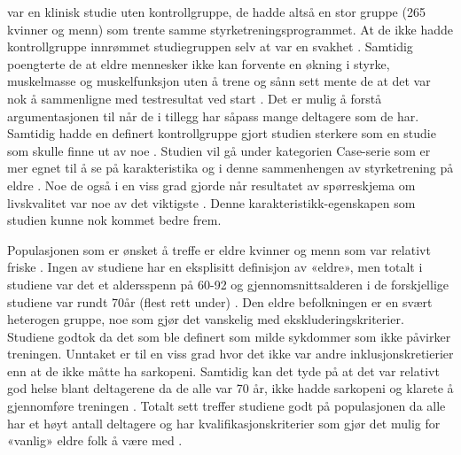 \documentclass[
]{book}
\begin{document}
\citet{geirsdottir2012} var en klinisk studie uten kontrollgruppe, de hadde altså en stor gruppe (265 kvinner og menn) som trente samme styrketreningsprogrammet. At de ikke hadde kontrollgruppe innrømmet studiegruppen selv at var en svakhet \citep{geirsdottir2012}. Samtidig poengterte de at eldre mennesker ikke kan forvente en økning i styrke, muskelmasse og muskelfunksjon uten å trene og sånn sett mente de at det var nok å sammenligne med testresultat ved start \citep{geirsdottir2012}. Det er mulig å forstå argumentasjonen til \citet{geirsdottir2012} når de i tillegg har såpass mange deltagere som de har. Samtidig hadde en definert kontrollgruppe gjort studien sterkere som en studie som skulle finne ut av noe \citep[s. 87]{hulley2013}. Studien vil gå under kategorien Case-serie som er mer egnet til å se på karakteristika og i denne sammenhengen av styrketrening på eldre \citep[s. 87]{hulley2013}. Noe de også i en viss grad gjorde når resultatet av spørreskjema om livskvalitet var noe av det viktigste \citep{geirsdottir2012}. Denne karakteristikk-egenskapen som studien kunne nok kommet bedre frem.

Populasjonen som er ønsket å treffe er eldre kvinner og menn som var relativt friske \citep{geirsdottir2012, schott2019, turpela2017, vikberg2019, vincent2002}. Ingen av studiene har en eksplisitt definisjon av «eldre», men totalt i studiene var det et aldersspenn på 60-92 og gjennomsnittsalderen i de forskjellige studiene var rundt 70år (flest rett under) \citep{geirsdottir2012, schott2019, turpela2017, vikberg2019, vincent2002}. Den eldre befolkningen er en svært heterogen gruppe, noe som gjør det vanskelig med ekskluderingskriterier. Studiene godtok da det som ble definert som milde sykdommer som ikke påvirker treningen. Unntaket er til en viss grad \citet{vikberg2019} hvor det ikke var andre inklusjonskretierier enn at de ikke måtte ha sarkopeni. Samtidig kan det tyde på at det var relativt god helse blant deltagerene da de alle var 70 år, ikke hadde sarkopeni og klarete å gjennomføre treningen \citep{vikberg2019}. Totalt sett treffer studiene godt på populasjonen da alle har et høyt antall deltagere og har kvalifikasjonskriterier som gjør det mulig for «vanlig» eldre folk å være med \citep{geirsdottir2012, schott2019, turpela2017, vikberg2019, vincent2002}.
\end{document}
